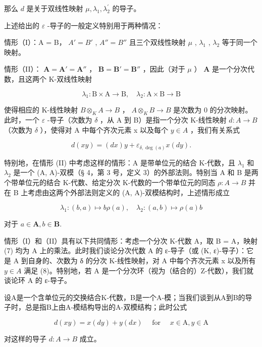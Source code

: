 那么 \(d\) 是关于双线性映射 \(\mu, \lambda_{1}, \lambda_{2}^{\prime}\) 的导子。

上述给出的 \(\varepsilon\) -导子的一般定义特别用于两种情况：

情形（I）：A = B， \(A' = B'\) , \(A'' = B''\) 且三个双线性映射 \(\mu\) , \(\lambda_{1}\) , \(\lambda_{2}\) 等于同一个映射。

情形（II）： \(\mathbf{A} = \mathbf{A}' = \mathbf{A}''\) ， \(\mathbf{B} = \mathbf{B}' = \mathbf{B}''\) ，因此（对于 \(\mu\) ） \(\mathbf{A}\) 是一个分次代数，且这两个 K-双线性映射

\[
\lambda_ {1} \colon \mathrm{B} \times \mathrm{A} \rightarrow \mathrm{B}, \quad \lambda_ {2} \colon \mathrm{A} \times \mathrm{B} \rightarrow \mathrm{B}\tag{7}
\]

使得相应的 K-线性映射 \(B \otimes_{K} A \to B\) ， \(A \otimes_{K} B \to B\) 是次数为 0 的分次映射。此时，一个 \(\varepsilon\) -导子（次数为 \(\delta\) ，从 A 到 B）是指一个分次 K-线性映射 \(d: A \to B\) （次数为 \(\delta\) ），使得对 A 中每个齐次元素 x 以及每个 \(y \in A\) ，我们有关系式

\[
d (x y) = (d x) y + \varepsilon_ {\delta , \deg (a)} x (d y).\tag{8}
\]

特别地，在情形 (II) 中考虑这样的情形：A 是带单位元的结合 K-代数，且 \(\lambda_{1}\) 和 \(\lambda_{2}\) 是一个 (A, A)-双模（§ 4，第 3 号，定义 3）的外部法则。特别当 A 和 B 是两个带单位元的结合 K-代数、给定分次 K-代数的一个带单位元的同态 \(\rho: A \to B\) 并在 B 上考虑由这两个外部法则定义的 (A, A)-双模结构时，上述情形成立

\[
\lambda_ {1} \colon (b, a) \mapsto b \rho (a), \quad \lambda_ {2} \colon (a, b) \mapsto \rho (a) b
\]

对于 \(a\in \mathbf{A},b\in \mathbf{B}.\)

情形（I）和（II）具有以下共同情形：考虑一个分次 K-代数 A，取 B = A，映射 (7) 均为 A 上的乘法。此时我们谈论分次代数 A 的 ε-导子（或 (K, ε)-导子）：它是 A 到自身的、次数为 δ 的分次 K-线性映射，对 A 中每个齐次元素 x 以及所有 \(y \in A\) 满足 (8)。特别地，若 A 是一个分次环（视为（结合的）Z-代数），我们就谈论环 A 的 ε-导子。

设A是一个含单位元的交换结合K-代数，B是一个A-模；当我们谈到从A到B的导子时，总是指B上由A-模结构导出的A-双模结构；此时公式

\[
d (x y) = x (d y) + y (d x) \quad \text { for } \quad x \in \mathrm{A}, y \in \mathrm{A}\tag{9}
\]

对这样的导子 \(d: A \rightarrow B\) 成立。

